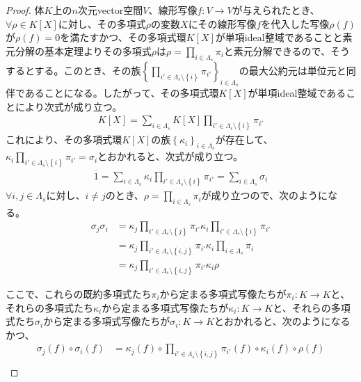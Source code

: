 \documentclass[dvipdfmx]{jsarticle}
\begin{document}
\begin{proof}
体$K$上の$n$次元vector空間$V$、線形写像$f:V \rightarrow V$が与えられたとき、$\forall\rho \in K[ X]$に対し、その多項式$\rho$の変数$X$にその線形写像$f$を代入した写像$\rho(f)$が$\rho(f) = 0$を満たすかつ、その多項式環$K[ X]$が単項ideal整域であることと素元分解の基本定理よりその多項式$\rho$は$\rho = \prod_{i \in \varLambda_{s}} {\pi_{i}}$と素元分解できるので、そうするとする。このとき、その族$\left\{ \prod_{i' \in \varLambda_{s} \setminus \left\{ i \right\}} {\pi_{i'}} \right\}_{i \in \varLambda_{s}}$の最大公約元は単位元と同伴であることになる。したがって、その多項式環$K[ X]$が単項ideal整域であることにより次式が成り立つ。
\begin{align*}
K[ X] = \sum_{i \in \varLambda_{s}} {K[ X]\prod_{i' \in \varLambda_{s} \setminus \left\{ i \right\}} {\pi_{i'}}}
\end{align*}
これにより、その多項式環$K[ X]$の族$\left\{ \kappa_{i} \right\}_{i \in \varLambda_{s}}$が存在して、$\kappa_{i}\prod_{i' \in \varLambda_{s} \setminus \left\{ i \right\}} {\pi_{i'}} = \sigma_{i}$とおかれると、次式が成り立つ。
\begin{align*}
\overline{1} = \sum_{i \in \varLambda_{s}} {\kappa_{i}\prod_{i' \in \varLambda_{s} \setminus \left\{ i \right\}} {\pi_{i'}}} = \sum_{i \in \varLambda_{s}} {\sigma_{i}}
\end{align*}
$\forall i,j \in \varLambda_{s}$に対し、$i \neq j$のとき、$\rho = \prod_{i \in \varLambda_{s}} {\pi_{i}}$が成り立つので、次のようになる。
\begin{align*}
\sigma_{j}\sigma_{i} &= \kappa_{j}\prod_{i' \in \varLambda_{s} \setminus \left\{ j \right\}} {\pi_{i'}}\kappa_{i}\prod_{i' \in \varLambda_{s} \setminus \left\{ i \right\}} {\pi_{i'}}\\
&= \kappa_{j}\prod_{i' \in \varLambda_{s} \setminus \left\{ i,j \right\}} {\pi_{i'}}\kappa_{i}\prod_{i \in \varLambda_{s}} {\pi_{i}}\\
&= \kappa_{j}\prod_{i' \in \varLambda_{s} \setminus \left\{ i,j \right\}} {\pi_{i'}}\kappa_{i}\rho
\end{align*}\par
ここで、これらの既約多項式たち$\pi_{i}$から定まる多項式写像たちが$\pi_{i}:K \rightarrow K$と、それらの多項式たち$\kappa_{i}$から定まる多項式写像たちが$\kappa_{i}:K \rightarrow K$と、それらの多項式たち$\sigma_{i}$から定まる多項式写像たちが$\sigma_{i}:K \rightarrow K$とおかれると、次のようになるかつ、
\begin{align*}
\sigma_{j}(f) \circ \sigma_{i}(f) &= \kappa_{j}(f) \circ \prod_{i' \in \varLambda_{s} \setminus \left\{ i,j \right\}} {\pi_{i'}(f)} \circ \kappa_{i}(f) \circ \rho(f)\\

\end{align*}
\end{proof}
\end{document}
